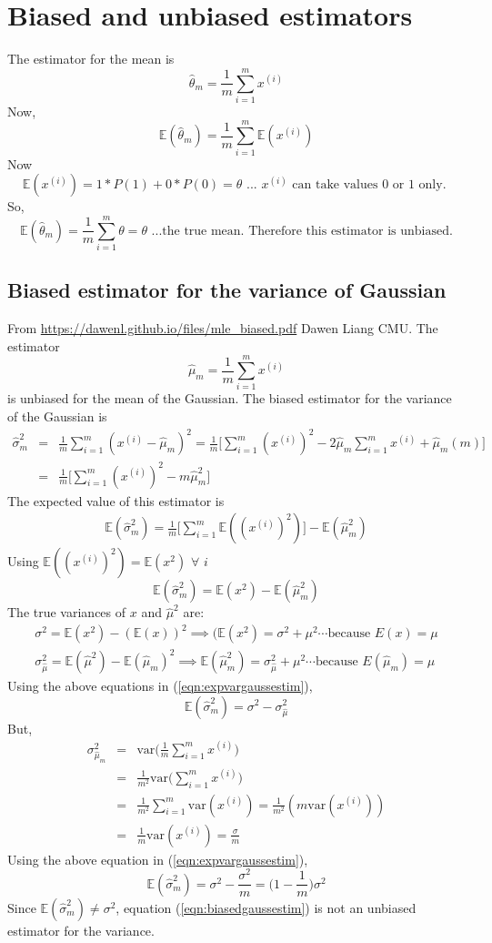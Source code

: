 \documentclass{article}
\newcommand{\beq}{\begin{equation}}
\newcommand{\eeq}{\end{equation}}
\newcommand{\ber}{\begin{eqnarray}}
\newcommand{\eer}{\end{eqnarray}}
\begin{document}
\section{Biased and unbiased estimators}
The estimator for the mean is
\beq
\hat{\theta}_m = \frac{1}{m}\sum_{i=1}^{m}x^{(i)}
\eeq
Now,
\beq
\mathbb{E}(\hat{\theta}_m) = \frac{1}{m}\sum_{i=1}^{m}\mathbb{E}(x^{(i)})
\eeq
Now
\beq
\mathbb{E}(x^{(i)}) = 1*P(1) + 0*P(0) = \theta \text{ ... } x^{(i)} \text{ can take values 0 or 1 only. }
\eeq
So,
\beq
\mathbb{E}(\hat{\theta}_m) = \frac{1}{m}\sum_{i=1}^{m}\theta = \theta \text{ ...the true mean. Therefore this estimator is unbiased.}  
\eeq
\subsection{Biased estimator for the variance of Gaussian}
From \url{https://dawenl.github.io/files/mle_biased.pdf} Dawen Liang CMU.
The estimator
\beq
\hat{\mu}_{m} = \frac{1}{m}\sum_{i=1}^{m} x^{(i)}
\eeq
is unbiased for the mean of the Gaussian. The biased estimator for the variance of the Gaussian is
\ber
\hat{\sigma}^2_m &=& \frac{1}{m}\sum_{i=1}^{m}(x^{(i)}-\hat{\mu}_m)^2 = \frac{1}{m}\Big[\sum_{i=1}^{m}(x^{(i)})^2 - 2\hat{\mu}_{m}\sum_{i=1}^{m}x^{(i)} + \hat{\mu}_m(m)\Big]\\
&=& \frac{1}{m}\Big[\sum_{i=1}^{m}(x^{(i)})^2 - m\hat{\mu}_m^2\Big] \label{eqn:biasedgaussestim}
\eer
The expected value of this estimator is
\ber
\mathbb{E}(\hat{\sigma}^2_m) = \frac{1}{m}\Big[\sum_{i=1}^{m}\mathbb{E}((x^{(i)})^2)\Big]-\mathbb{E}(\hat{\mu}_m^2)
\eer
Using $\mathbb{E}((x^{(i)})^2)=\mathbb{E}(x^2) \,\,\forall\,\,i$
\beq
\label{eqn:expvargaussestim}
\mathbb{E}(\hat{\sigma}^2_m) = \mathbb{E}(x^2) - \mathbb{E}(\hat{\mu}^2_m)
\eeq
The true variances of $x$ and $\hat{\mu}^2$ are:
\ber
\sigma^2 = \mathbb{E}(x^2) - (\mathbb{E}(x))^2 \implies (\mathbb{E}(x^2) = \sigma^2 + \mu^2 \cdots \text{because } E(x)=\mu\\
\sigma^2_{\hat{\mu}} = \mathbb{E}(\hat{\mu}^2) - \mathbb{E}(\hat{\mu}_m)^2 \implies \mathbb{E}(\hat{\mu}^2_m) =  \sigma^2_{\hat{\mu}} + \mu^2 \cdots \text{because } E(\hat{\mu}_m)=\mu
\eer
Using the above equations in (\ref{eqn:expvargaussestim}),
\beq
\label{eqn:expvargaussestim2}
\mathbb{E}(\hat{\sigma}^2_m)  = \sigma^2 - \sigma^2_{\hat{\mu}}
\eeq
But,
\ber
\sigma^2_{\hat{\mu}_m} &=& \text{var}\Big( \frac{1}{m}\sum_{i=1}^{m} x^{(i)}\Big) \\
&=& \frac{1}{m^2}\text{var}\Big(\sum_{i=1}^{m} x^{(i)}\Big) \\
&=& \frac{1}{m^2}\sum_{i=1}^{m}\text{var}(x^{(i)}) = \frac{1}{m^2}(m\text{var}(x^{(i)}))\\
&=&\frac{1}{m}\text{var}(x^{(i)})= \frac{\sigma}{m}
\eer
Using the above equation in (\ref{eqn:expvargaussestim}),
\beq
\mathbb{E}(\hat{\sigma}^2_m) = \sigma^2 - \frac{\sigma^2}{m} = \Big(1-\frac{1}{m}\Big)\sigma^2
\eeq
Since $\mathbb{E}(\hat{\sigma}^2_m)\ne \sigma^2$, equation (\ref{eqn:biasedgaussestim}) is not an unbiased estimator for the variance.
\end{document}

